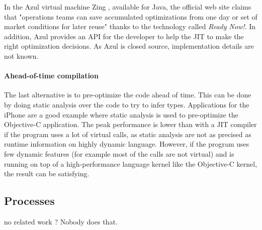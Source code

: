 \documentclass[a4paper,12pt,twoside]{../includes/ThesisStyle}
\begin{document}
In the Azul virtual machine Zing \cite{Azul}, available for Java, the official web site claims that "operations teams can save accumulated optimizations from one day or set of market conditions for later reuse" thanks to the technology called \emph{Ready Now!}. In addition, Azul provides an API for the developer to help the JIT to make the right optimization decisions. As Azul is closed source, implementation details are not known. 

\paragraph{Ahead-of-time compilation}

The last alternative is to pre-optimize the code ahead of time. This can be done by doing static analysis over the code to try to infer types. Applications for the iPhone are a good example where static analysis is used to pre-optimize the Objective-C application. The peak performance is lower than with a JIT compiler if the program uses a lot of virtual calls, as static analysis are not as precised as runtime information on highly dynamic language. 
However, if the program uses few dynamic features (for example most of the calls are not virtual) and is running on top of a high-performance language kernel like the Objective-C kernel, the result can be satisfying.


\subsection{Processes}

no related work ?
Nobody does that.

\ifx\wholebook\relax\else
    
\end{document}
